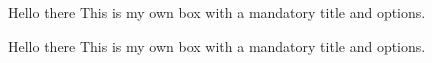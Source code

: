 \documentclass{beamer}
\begin{document}
\begin{frame}

\begin{mybox}{Hello there}
This is my own box with a mandatory title
and options.
\end{mybox}

\begin{mybox}[colframe=green!75!black,coltitle=green!75!black, ]{Hello there}
This is my own box with a mandatory title
and options.
\end{mybox}

\end{frame}
\end{document}
